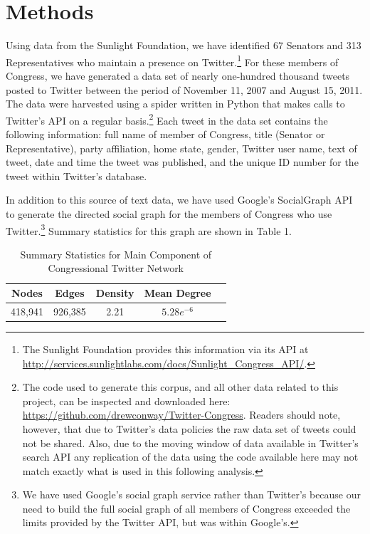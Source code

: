 \documentclass[10pt]{article}
\begin{document}
\section{Methods}
Using data from the Sunlight Foundation, we have identified 67 Senators and 313 Representatives who maintain a presence on Twitter.\footnote{The Sunlight Foundation provides this information via its API at \url{http://services.sunlightlabs.com/docs/Sunlight_Congress_API/}.} For these members of Congress, we have generated a data set of nearly one-hundred thousand tweets posted to Twitter between the period of November 11, 2007 and August 15, 2011.  The data were harvested using a spider written in Python that makes calls to Twitter's API on a regular basis.\footnote{The code used to generate this corpus, and all other data related to this project, can be inspected and downloaded here: \url{https://github.com/drewconway/Twitter-Congress}.  Readers should note, however, that due to Twitter's data policies the raw data set of tweets could not be shared.  Also, due to the moving window of data available in Twitter's search API any replication of the data using the code available here may not match exactly what is used in this following analysis.}  Each tweet in the data set contains the following information: full name of member of Congress, title (Senator or Representative), party affiliation, home state, gender, Twitter user name, text of tweet, date and time the tweet was published, and the unique ID number for the tweet within Twitter's database.

In addition to this source of text data, we have used Google's SocialGraph API to generate the directed social graph for the members of Congress who use Twitter.\footnote{We have used Google's social graph service rather than Twitter's because our need to build the full social graph of all members of Congress exceeded the limits provided by the Twitter API, but was within Google's.} Summary statistics for this graph are shown in Table 1.

\begin{table}[htdp]
    \centering
    \caption{Summary Statistics for Main Component of Congressional Twitter Network}
    \begin{tabular}{|c|c|c|c|c|}
        \hline
        Nodes & Edges & Density & Mean Degree \\ \hline
        418,941 & 926,385 & 2.21 & $5.28e^{-6}$ \\ \hline
    \end{tabular}
\end{table}
\end{document}
